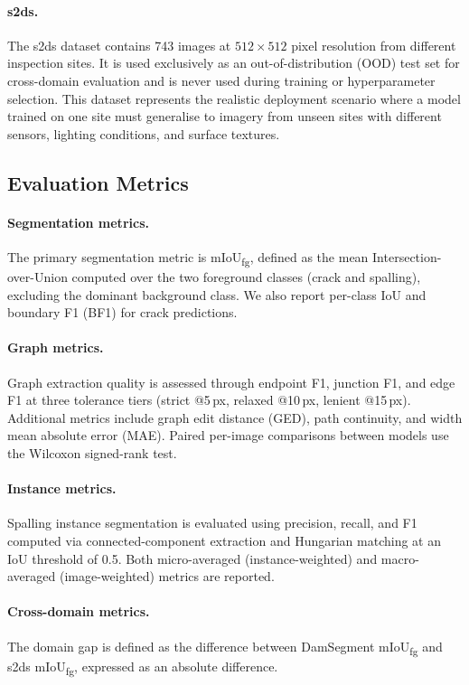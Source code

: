 \documentclass[preprint,12pt]{elsarticle}
\begin{document}
\paragraph{s2ds.}
The s2ds dataset contains 743 images at $512 \times 512$ pixel resolution from different inspection sites. It is used exclusively as an out-of-distribution (OOD) test set for cross-domain evaluation and is never used during training or hyperparameter selection. This dataset represents the realistic deployment scenario where a model trained on one site must generalise to imagery from unseen sites with different sensors, lighting conditions, and surface textures.

\subsection{Evaluation Metrics}
\label{sec:metrics}

\paragraph{Segmentation metrics.}
The primary segmentation metric is mIoU\textsubscript{fg}, defined as the mean Intersection-over-Union computed over the two foreground classes (crack and spalling), excluding the dominant background class. We also report per-class IoU and boundary F1 (BF1) for crack predictions.

\paragraph{Graph metrics.}
Graph extraction quality is assessed through endpoint F1, junction F1, and edge F1 at three tolerance tiers (strict @5\,px, relaxed @10\,px, lenient @15\,px). Additional metrics include graph edit distance (GED), path continuity, and width mean absolute error (MAE). Paired per-image comparisons between models use the Wilcoxon signed-rank test.

\paragraph{Instance metrics.}
Spalling instance segmentation is evaluated using precision, recall, and F1 computed via connected-component extraction and Hungarian matching at an IoU threshold of 0.5. Both micro-averaged (instance-weighted) and macro-averaged (image-weighted) metrics are reported.

\paragraph{Cross-domain metrics.}
The domain gap is defined as the difference between DamSegment mIoU\textsubscript{fg} and s2ds mIoU\textsubscript{fg}, expressed as an absolute difference.
\end{document}
